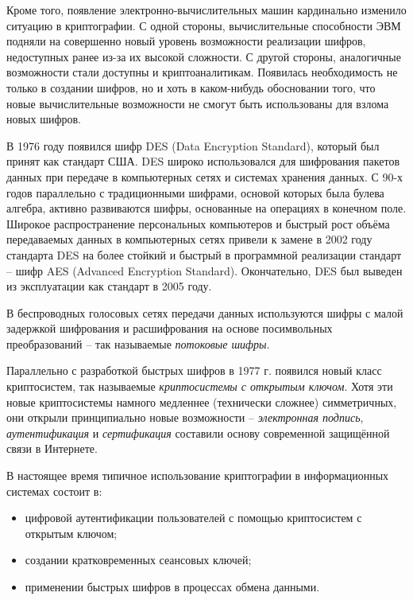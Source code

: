 Кроме того, появление электронно-вычислительных машин кардинально изменило ситуацию в криптографии. С одной стороны, вычислительные способности ЭВМ подняли на совершенно новый уровень возможности реализации шифров, недоступных ранее из-за их высокой сложности. С другой стороны, аналогичные возможности стали доступны и криптоаналитикам. Появилась необходимость не только в создании шифров, но и хоть в каком-нибудь обосновании того, что новые вычислительные возможности не смогут быть использованы для взлома новых шифров.

В 1976 году появился шифр DES (Data Encryption Standard), который был принят как стандарт США. DES широко использовался для шифрования пакетов данных при передаче в компьютерных сетях и системах хранения данных. С 90-х годов параллельно с традиционными шифрами, основой которых была булева алгебра, активно развиваются шифры, основанные на операциях в конечном поле. Широкое распространение персональных компьютеров и быстрый рост объёма передаваемых данных в компьютерных сетях привели к замене в 2002 году стандарта DES на более стойкий и быстрый в программной реализации стандарт -- шифр AES (Advanced Encryption Standard). Окончательно, DES был выведен из эксплуатации как стандарт в 2005 году.

В беспроводных голосовых сетях передачи данных используются шифры с малой задержкой шифрования и расшифрования на основе посимвольных преобразований -- так называемые \emph{потоковые шифры}.


Параллельно с разработкой быстрых шифров в 1977 г. появился новый класс криптосистем, так называемые \emph{криптосистемы с открытым ключом}. Хотя эти новые криптосистемы намного медленнее (технически сложнее) симметричных, они открыли принципиально новые возможности --  \emph{электронная подпись}, \emph{аутентификация} и \emph{сертификация} составили основу современной защищённой связи в Интернете.

В настоящее время типичное использование криптографии в информационных системах состоит в:
\begin{itemize}
\item цифровой аутентификации пользователей с помощью криптосистем с открытым ключом;
\item создании кратковременных сеансовых ключей;
\item применении быстрых шифров в процессах обмена данными.
\end{itemize}
